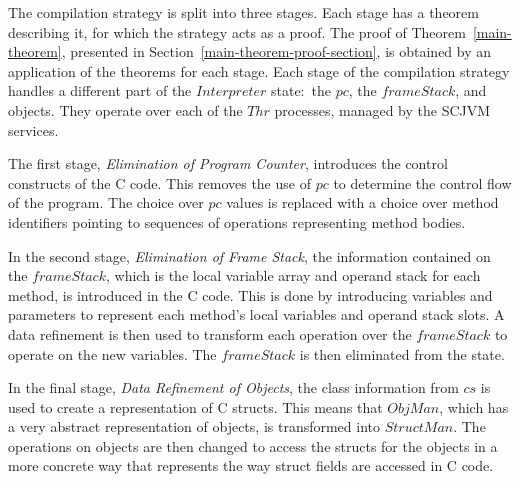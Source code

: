 The compilation strategy is split into three stages.
Each stage has a theorem describing it, for which the strategy acts as
a proof.
The proof of Theorem~\ref{main-theorem}, presented in
Section~\ref{main-theorem-proof-section}, is obtained by an
application of the theorems for each stage.
Each stage of the compilation strategy handles a different part of the
$Interpreter$ state:~the $pc$, the $frameStack$, and objects.
They operate over each of the $Thr$ processes, managed by the SCJVM
services.

The first stage, \emph{Elimination of Program Counter}, introduces the
control constructs of the C code.
This removes the use of $pc$ to determine the control flow of the
program.
The choice over $pc$ values is replaced with a choice over method
identifiers pointing to sequences of operations representing method
bodies.

In the second stage, \emph{Elimination of Frame Stack}, the
information contained on the $frameStack$, which is the local variable
array and operand stack for each method, is introduced in the C code.
This is done by introducing variables and parameters to represent each
method's local variables and operand stack slots.
A data refinement is then used to transform each operation over the
$frameStack$ to operate on the new variables.
The $frameStack$ is then eliminated from the state.

In the final stage, \emph{Data Refinement of Objects}, the class
information from $cs$ is used to create a representation of C structs.
This means that $ObjMan$, which has a very abstract representation of
objects, is transformed into $StructMan$.
The operations on objects are then changed to access the structs for
the objects in a more concrete way that represents the way struct
fields are accessed in C code.


